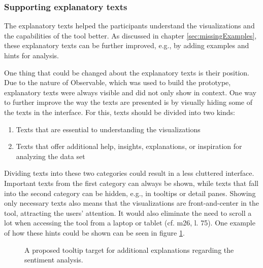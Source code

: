 \subsubsection*{Supporting explanatory texts}
The explanatory texts helped the participants understand the visualizations and the capabilities of the tool better. As discussed in chapter \ref{sec:missingExamples}, these explanatory texts can be further improved, e.g., by adding examples and hints for analysis.

One thing that could be changed about the explanatory texts is their position. Due to the nature of Observable, which was used to build the prototype, explanatory texts were always visible and did not only show in context. One way to further improve the way the texts are presented is by visually hiding some of the texts in the interface. For this, texts should be divided into two kinds:
\begin{enumerate}
    \item Texts that are essential to understanding the visualizations
    \item Texts that offer additional help, insights, explanations, or inspiration for analyzing the data set
\end{enumerate}

Dividing texts into these two categories could result in a less cluttered interface. Important texts from the first category can always be shown, while texts that fall into the second category can be hidden, e.g., in tooltips or detail panes. Showing only necessary texts also means that the visualizations are front-and-center in the tool, attracting the users' attention. It would also eliminate the need to scroll a lot when accessing the tool from a laptop or tablet (cf. m26, l. 75). One example of how these hints could be shown can be seen in figure \ref{fig:sentiment_tooltip_hint}.

\begin{figure}[htb]
    \centering
    \caption{A proposed tooltip target for additional explanations regarding the sentiment analysis.}
    \label{fig:sentiment_tooltip_hint}
\end{figure}

